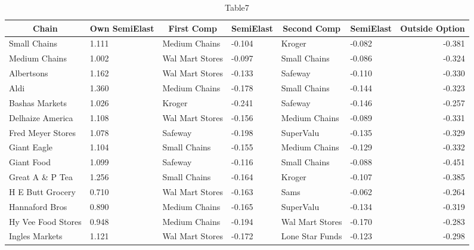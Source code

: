 \begin{table}[htbp]\centering 
\scriptsize 
\def\sym#1{\ifmmode^{#1}\else\(^{#1}\)\fi} 
\caption{ Table7 \label{tab1}} 
\begin{tabular}{ll|ll|ll|r} \toprule 
\multicolumn{1}{c}{ Chain }& \multicolumn{1}{c}{ Own SemiElast }& \multicolumn{1}{c}{ First Comp }& \multicolumn{1}{c}{ SemiElast }& \multicolumn{1}{c}{ Second Comp }& \multicolumn{1}{c}{ SemiElast }& \multicolumn{1}{c}{Outside Option}\\  
\midrule 
\textrm{ Small Chains } & 1.111 &\textrm{ Medium Chains } &-0.104 &\textrm{ Kroger  } &-0.082 & -0.381 \\ 
\textrm{ Medium Chains } & 1.002 &\textrm{ Wal Mart Stores } &-0.097 &\textrm{ Small Chains } &-0.086 & -0.324 \\ 
\textrm{ Albertsons  } & 1.162 &\textrm{ Wal Mart Stores } &-0.133 &\textrm{ Safeway  } &-0.110 & -0.330 \\ 
\textrm{ Aldi  } & 1.360 &\textrm{ Medium Chains } &-0.178 &\textrm{ Small Chains } &-0.144 & -0.323 \\ 
\textrm{ Bashas Markets } & 1.026 &\textrm{ Kroger  } &-0.241 &\textrm{ Safeway  } &-0.146 & -0.257 \\ 
\textrm{ Delhaize America } & 1.108 &\textrm{ Wal Mart Stores } &-0.156 &\textrm{ Medium Chains } &-0.089 & -0.331 \\ 
\textrm{ Fred Meyer Stores  } & 1.078 &\textrm{ Safeway  } &-0.198 &\textrm{ SuperValu  } &-0.135 & -0.329 \\ 
\textrm{ Giant Eagle } & 1.104 &\textrm{ Small Chains } &-0.155 &\textrm{ Medium Chains } &-0.129 & -0.332 \\ 
\textrm{ Giant Food } & 1.099 &\textrm{ Safeway  } &-0.116 &\textrm{ Small Chains } &-0.088 & -0.451 \\ 
\textrm{ Great A \& P Tea  } & 1.256 &\textrm{ Small Chains } &-0.164 &\textrm{ Kroger  } &-0.107 & -0.385 \\ 
\textrm{ H E Butt Grocery  } & 0.710 &\textrm{ Wal Mart Stores } &-0.163 &\textrm{ Sams } &-0.062 & -0.264 \\ 
\textrm{ Hannaford Bros  } & 0.890 &\textrm{ Medium Chains } &-0.165 &\textrm{ SuperValu  } &-0.134 & -0.319 \\ 
\textrm{ Hy Vee Food Stores  } & 0.948 &\textrm{ Medium Chains } &-0.194 &\textrm{ Wal Mart Stores } &-0.170 & -0.283 \\ 
\textrm{ Ingles Markets  } & 1.121 &\textrm{ Wal Mart Stores } &-0.172 &\textrm{ Lone Star Funds } &-0.123 & -0.298 \\ 

\end{tabular}
\end{table}
